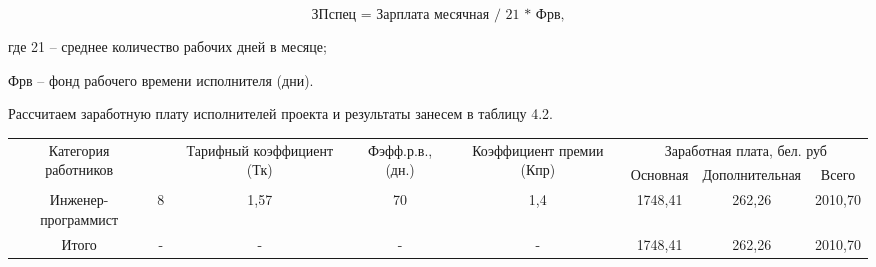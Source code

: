 {	\begin{equation}
		\textrm{ЗПспец = Зарплата месячная / 21 * Фрв,}
	\end{equation}
	
	\par \redline где 21 – среднее количество рабочих дней в месяце; 
    \par \redline \hspace{7mm}Фрв – фонд рабочего времени исполнителя (дни).
	\par \redline Рассчитаем заработную плату исполнителей проекта и результаты занесем в таблицу 4.2.
	
	\begin{table}[]
		\centering
		\begin{tabular}{|c|c|c|c|c|ccc|}
		\hline
		\multirow{2}{*}{Категория работников} &
		  \begin{sideways} \multirow{2}{*}{Разряд} \end{sideways} &
		  \multirow{2}{*}{Тарифный коэффициент (Тк)} &
		  \multirow{2}{*}{Фэфф.р.в.,(дн.)} &
		  \multirow{2}{*}{Коэффициент премии (Кпр)} &
		  \multicolumn{3}{c|}{Заработная плата, бел. руб} \\ \cline{6-8} 
							&   &      &    &     & \multicolumn{1}{c|}{Основная} & \multicolumn{1}{c|}{Дополнительная} & Всего   \\ \hline
		Инженер-программист & 8 & 1,57 & 70 & 1,4 & \multicolumn{1}{c|}{1748,41}  & \multicolumn{1}{c|}{262,26}         & 2010,70 \\ \hline
		Итого               & - & -    & -  & -   & \multicolumn{1}{c|}{1748,41}  & \multicolumn{1}{c|}{262,26}         & 2010,70 \\ \hline
		\end{tabular}
		\end{table}

	\par 
}
